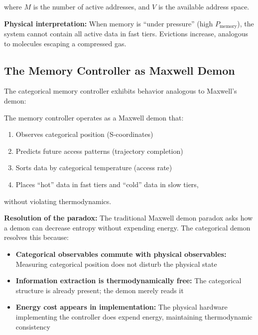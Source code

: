 where $M$ is the number of active addresses, and $V$ is the available address space.

\textbf{Physical interpretation:} When memory is ``under pressure'' (high $P_{\text{memory}}$), the system cannot contain all active data in fast tiers. Evictions increase, analogous to molecules escaping a compressed gas.

\subsection{The Memory Controller as Maxwell Demon}

The categorical memory controller exhibits behavior analogous to Maxwell's demon:

\begin{proposition}
\label{prop:maxwell_demon}
The memory controller operates as a Maxwell demon that:
\begin{enumerate}
\item Observes categorical position (S-coordinates)
\item Predicts future access patterns (trajectory completion)
\item Sorts data by categorical temperature (access rate)
\item Places ``hot'' data in fast tiers and ``cold'' data in slow tiers,
\end{enumerate}
without violating thermodynamics.
\end{proposition}

\textbf{Resolution of the paradox:} The traditional Maxwell demon paradox asks how a demon can decrease entropy without expending energy. The categorical demon resolves this because:

\begin{itemize}
\item \textbf{Categorical observables commute with physical observables:} Measuring categorical position does not disturb the physical state
\item \textbf{Information extraction is thermodynamically free:} The categorical structure is already present; the demon merely reads it
\item \textbf{Energy cost appears in implementation:} The physical hardware implementing the controller does expend energy, maintaining thermodynamic consistency
\end{itemize}

